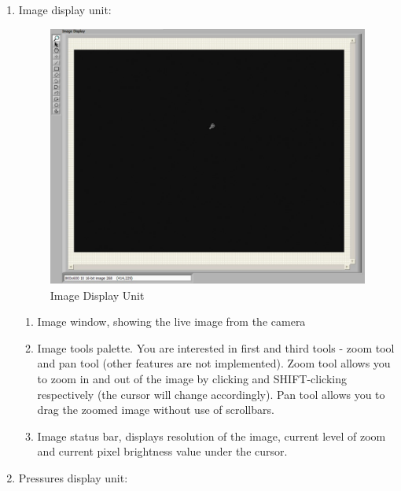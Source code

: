\begin{enumerate}
	
	\item Image display unit:
	
	\begin{figure}[htbp]
		\centering
			\includegraphics[width=1.00\textwidth]{figs/labvamp_imgdisplay.pdf}
		\caption{Image Display Unit}
		\label{fig:LabVAMP_imgdisplay}
	\end{figure}
	
	\begin{enumerate}
		\item Image window, showing the live image from the camera
		\item Image tools palette. You are interested in first and third tools - zoom tool and pan tool (other features are not implemented). Zoom tool allows you to zoom in and out of the image by clicking and SHIFT-clicking respectively (the cursor will change accordingly). Pan tool allows you to drag the zoomed image without use of scrollbars.
		\item Image status bar, displays resolution of the image, current level of zoom and current pixel brightness value under the cursor.
	\end{enumerate}
	
	\item Pressures display unit:
	

\end{enumerate}
